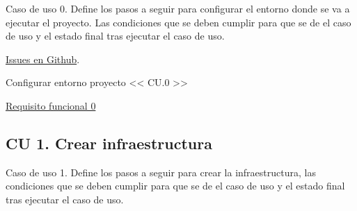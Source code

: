 	\begin{text}
		Caso de uso 0. Define los pasos a seguir para configurar el entorno donde se va a ejecutar el proyecto. Las condiciones que se deben cumplir para que se de el caso de uso y el estado final tras ejecutar el caso de uso.
	\end{text}

	\href{https://github.com/VictorMorenoJimenez/tfg2020/milestone/11?closed=1}{Issues en Github}.

	\begin{usecase}{Configurar entorno proyecto << CU.0 >>}
		
		
		
		
		\hline
	\end{usecase}

	\hyperref[RF0]{Requisito funcional 0}
	\clearpage
	
	\subsection{CU 1. Crear infraestructura}
	
	\begin{text}
		Caso de uso 1. Define los pasos a seguir para crear la infraestructura, las condiciones que se deben cumplir para que se de el caso de uso y el estado final tras ejecutar el caso de uso.
	\end{text}

